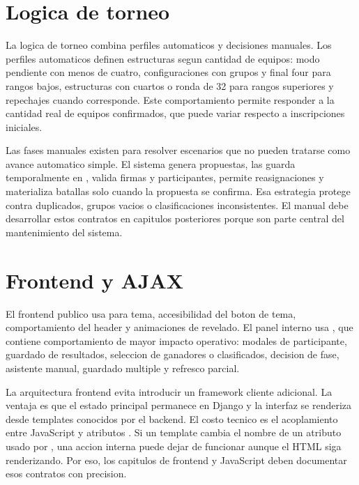 \section{Logica de torneo}
\label{sec:arquitectura-logica-torneo}

La logica de torneo combina perfiles automaticos y decisiones manuales. Los perfiles automaticos definen estructuras segun cantidad de equipos: modo pendiente con menos de cuatro, configuraciones con grupos y final four para rangos bajos, estructuras con cuartos o ronda de 32 para rangos superiores y repechajes cuando corresponde. Este comportamiento permite responder a la cantidad real de equipos confirmados, que puede variar respecto a inscripciones iniciales.

Las fases manuales existen para resolver escenarios que no pueden tratarse como avance automatico simple. El sistema genera propuestas, las guarda temporalmente en , valida firmas y participantes, permite reasignaciones y materializa batallas solo cuando la propuesta se confirma. Esa estrategia protege contra duplicados, grupos vacios o clasificaciones inconsistentes. El manual debe desarrollar estos contratos en capitulos posteriores porque son parte central del mantenimiento del sistema.

\section{Frontend y AJAX}
\label{sec:arquitectura-frontend-ajax}

El frontend publico usa  para tema, accesibilidad del boton de tema, comportamiento del header y animaciones de revelado. El panel interno usa , que contiene comportamiento de mayor impacto operativo: modales de participante, guardado de resultados, seleccion de ganadores o clasificados, decision de fase, asistente manual, guardado multiple y refresco parcial.

La arquitectura frontend evita introducir un framework cliente adicional. La ventaja es que el estado principal permanece en Django y la interfaz se renderiza desde templates conocidos por el backend. El costo tecnico es el acoplamiento entre JavaScript y atributos . Si un template cambia el nombre de un atributo usado por , una accion interna puede dejar de funcionar aunque el HTML siga renderizando. Por eso, los capitulos de frontend y JavaScript deben documentar esos contratos con precision.

